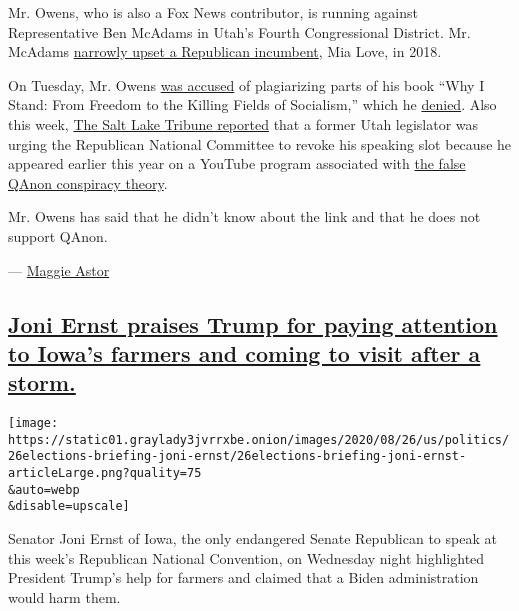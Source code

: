 Mr. Owens, who is also a Fox News contributor, is running against
Representative Ben McAdams in Utah's Fourth Congressional District. Mr.
McAdams
\href{https://www.nytimes3xbfgragh.onion/2018/11/20/us/politics/mia-love-utah-loses.html}{narrowly
upset a Republican incumbent}, Mia Love, in 2018.

On Tuesday, Mr. Owens
\href{https://www.mediamatters.org/congress/burgess-owens-plagiarized-numerous-passages-his-book-why-i-stand}{was
accused} of plagiarizing parts of his book ``Why I Stand: From Freedom
to the Killing Fields of Socialism,'' which he
\href{https://kutv.com/news/local/utah-4th-district-gop-nominee-burgess-owens-defends-book-from-plagiarism-allegations}{denied}.
Also this week,
\href{https://www.sltrib.com/news/politics/2020/08/25/former-utah-lawmaker/}{The
Salt Lake Tribune reported} that a former Utah legislator was urging the
Republican National Committee to revoke his speaking slot because he
appeared earlier this year on a YouTube program associated with
\href{https://www.nytimes3xbfgragh.onion/article/what-is-qanon.html}{the
false QAnon conspiracy theory}.

Mr. Owens has said that he didn't know about the link and that he does
not support QAnon.

--- \href{https://www.nytimes3xbfgragh.onion/by/maggie-astor}{Maggie
Astor}

\hypertarget{joni-ernst-praises-trump-for-paying-attention-to-iowas-farmers-and-coming-to-visit-after-a-storm}{%
\subsection{\texorpdfstring{\protect\hyperlink{joni-ernst-praises-trump-for-paying-attention-to-iowas-farmers-and-coming-to-visit-after-a-storm}{Joni
Ernst praises Trump for paying attention to Iowa's farmers and coming to
visit after a
storm.}}{Joni Ernst praises Trump for paying attention to Iowa's farmers and coming to visit after a storm.}}\label{joni-ernst-praises-trump-for-paying-attention-to-iowas-farmers-and-coming-to-visit-after-a-storm}}

\texttt{[image: https://static01.graylady3jvrrxbe.onion/images/2020/08/26/us/politics/26elections-briefing-joni-ernst/26elections-briefing-joni-ernst-articleLarge.png?quality=75\\\&auto=webp\\\&disable=upscale]}

Senator Joni Ernst of Iowa, the only endangered Senate Republican to
speak at this week's Republican National Convention, on Wednesday night
highlighted President Trump's help for farmers and claimed that a Biden
administration would harm them.

